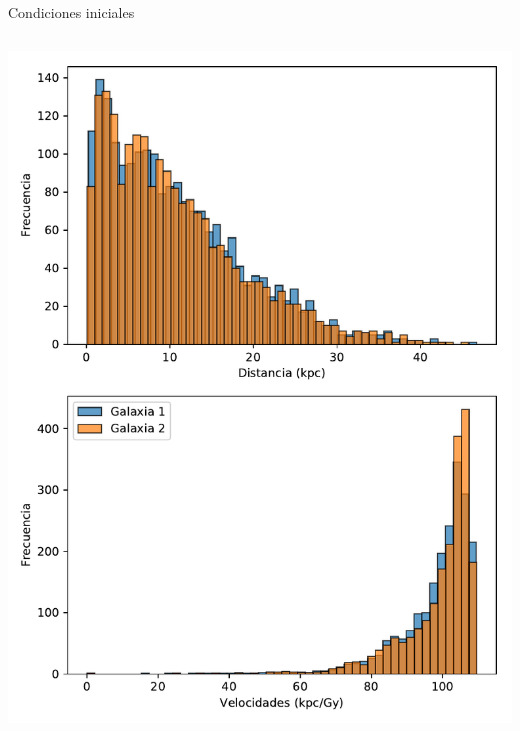 \documentclass[handout]{beamer}
\begin{document}
\begin{frame}{Condiciones iniciales}
\begin{columns}
\begin{column}{0.65\textwidth}
			\includegraphics[height=0.75\textheight]{sources/images/galaxy_distribution.pdf}\\
		\end{column}
	\end{columns}
\end{frame}
\end{document}

